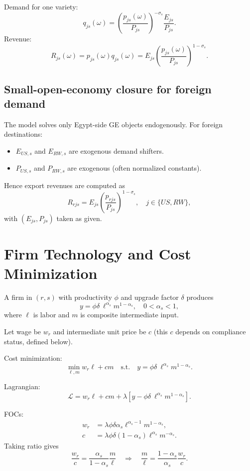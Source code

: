 \documentclass[11pt]{article}
\begin{document}
Demand for one variety:
\begin{equation}
q_{js}(\omega) = \left(\frac{p_{js}(\omega)}{P_{js}}\right)^{-\sigma_s}\frac{E_{js}}{P_{js}}.
\label{eq:var_demand}
\end{equation}
Revenue:
\begin{equation}
R_{js}(\omega) = p_{js}(\omega) q_{js}(\omega)
= E_{js}\left(\frac{p_{js}(\omega)}{P_{js}}\right)^{1-\sigma_s}.
\label{eq:revenue}
\end{equation}

\subsection{Small-open-economy closure for foreign demand}
The model solves only Egypt-side GE objects endogenously. For foreign destinations:
\begin{itemize}
    \item $E_{US,s}$ and $E_{RW,s}$ are exogenous demand shifters.
    \item $P_{US,s}$ and $P_{RW,s}$ are exogenous (often normalized constants).
\end{itemize}
Hence export revenues are computed as
\[
R_{rjs}=E_{js}\left(\frac{p_{rjs}}{P_{js}}\right)^{1-\sigma_s},\quad j\in\{US,RW\},
\]
with $(E_{js},P_{js})$ taken as given.

\section{Firm Technology and Cost Minimization}
A firm in $(r,s)$ with productivity $\phi$ and upgrade factor $\delta$ produces
\begin{equation}
y = \phi \delta\ \ell^{\alpha_s} m^{1-\alpha_s},
\quad 0<\alpha_s<1,
\label{eq:production}
\end{equation}
where $\ell$ is labor and $m$ is composite intermediate input.

Let wage be $w_r$ and intermediate unit price be $c$ (this $c$ depends on compliance status, defined below).

Cost minimization:
\[
\min_{\ell,m} w_r \ell + c m
\quad \text{s.t.}\quad
y = \phi\delta\ \ell^{\alpha_s} m^{1-\alpha_s}.
\]

Lagrangian:
\[
\mathcal L = w_r \ell + c m + \lambda\left[y-\phi\delta\ \ell^{\alpha_s}m^{1-\alpha_s}\right].
\]

FOCs:
\begin{align}
w_r &= \lambda\phi\delta\alpha_s \ell^{\alpha_s-1}m^{1-\alpha_s},\\
c &= \lambda\phi\delta(1-\alpha_s)\ell^{\alpha_s}m^{-\alpha_s}.
\end{align}
Taking ratio gives
\begin{equation}
\frac{w_r}{c} = \frac{\alpha_s}{1-\alpha_s}\frac{m}{\ell}
\quad\Rightarrow\quad
\frac{m}{\ell} = \frac{1-\alpha_s}{\alpha_s}\frac{w_r}{c}.
\end{equation}
\end{document}
